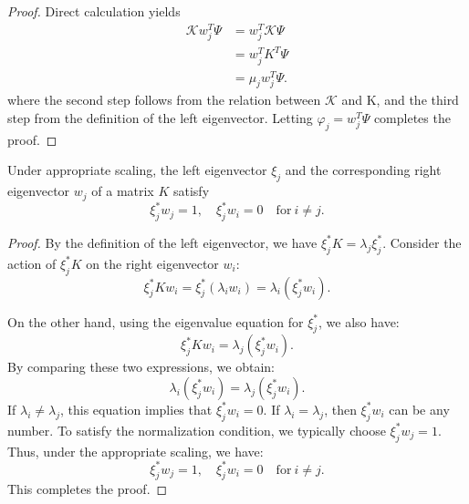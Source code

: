 \begin{proof}
  Direct calculation yields
  \begin{align*}
    \mathcal{K} w_j^T \Psi &= w_j^T \mathcal{K} \Psi\\
                             &= w_j^T K^T \Psi\\
                             &= \mu_j w_j^T \Psi.
  \end{align*}
  where the second step follows from the relation between $\mathcal{K}$ and K,
  and the third step from the definition of the left eigenvector.
  Letting $\varphi_j = w_j^T \Psi$ completes the proof.
\end{proof}


\begin{lemma}
  \label{lem:relation-between-right-and-left-eigenvector}
  Under appropriate scaling,
  the left eigenvector $\xi_j$ and the corresponding
  right eigenvector $w_j$ of a matrix $K$ satisfy
  \begin{equation}
    \label{eq:relation-between-right-and-left-eigenvector}
    \xi_j^{\ast} w_j = 1, \quad \xi_j^{\ast}w_i = 0 \quad  \mathrm{for} ~ i \neq j.
  \end{equation}
\end{lemma}

\begin{proof}
  By the definition of the left eigenvector, we have $\xi_j^\ast K = \lambda_j \xi_j^\ast$.
  Consider the action of $\xi_j^\ast K$ on the right eigenvector $w_i$:
  \begin{equation*}
  \xi_j^\ast K w_i = \xi_j^\ast (\lambda_i w_i) = \lambda_i (\xi_j^\ast w_i).
  \end{equation*}

  On the other hand, using the eigenvalue equation for $\xi_j^\ast$, we also have:
  \begin{equation*}
  \xi_j^\ast K w_i = \lambda_j (\xi_j^\ast w_i).
  \end{equation*}
  By comparing these two expressions, we obtain:
  \begin{equation*}
  \lambda_i (\xi_j^\ast w_i) = \lambda_j (\xi_j^\ast w_i).
  \end{equation*}
  If $\lambda_i \neq \lambda_j$, this equation implies that $\xi_j^\ast w_i = 0$.
  If $\lambda_i = \lambda_j$, then $\xi_j^\ast w_i$ can be any number.
  To satisfy the normalization condition, we typically choose $\xi_j^\ast w_j = 1$.
  Thus, under the appropriate scaling, we have:
  \begin{equation*}
  \xi_j^\ast w_j = 1, \quad \xi_j^\ast w_i = 0 \quad \mathrm{for} ~  i \neq j.
  \end{equation*}
  This completes the proof.
\end{proof}

